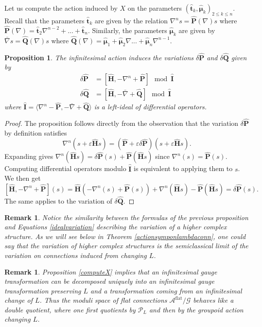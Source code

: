 \documentclass[11pt]{amsart}
\newtheorem{prop}[thm]{Proposition}
\newtheorem{Remark}[thm]{Remark}
\numberwithin{thm}{section} %
\numberwithin{equation}{section} %
\numberwithin{figure}{section} %
\begin{document}
Let us compute the action induced by $X$ on the parameters $(\bm\hat{t}_k, \bm\hat{\mu}_k)_{2\leq k\leq n}$. Recall that the parameters $\bm\hat{t}_k$ are given by the relation $\nabla^n s = \bm\hat{P}(\nabla)s$ where $\bm\hat{P}(\nabla)=\bm\hat{t}_2\nabla^{n-2}+...+\bm\hat{t}_n$. Similarly, the parameters $\bm\hat{\mu}_k$ are given by $\bar{\nabla}s = \bm\hat{Q}(\nabla)s$ where $\bm\hat{Q}(\nabla) = \bm\hat{\mu}_1+\bm\hat{\mu}_2\nabla...+\bm\hat{\mu}_n\nabla^{n-1}$.

\begin{prop}\label{variation-infinit}
The infinitesimal action induces the variations $\delta \bm\hat{P}$ and $\delta \bm\hat{Q}$ given by
\begin{align*}
\delta \bm\hat{P} &= [\bm\hat{H}, -\nabla^n+\bm\hat{P}] \mod \bm\hat{I} \\
\delta \bm\hat{Q} &= [\bm\hat{H}, -\bar{\nabla}+\bm\hat{Q}] \mod \bm\hat{I}
\end{align*}
where $\bm\hat{I} = \langle \nabla^n-\bm\hat{P}, -\bar{\nabla}+\bm\hat{Q} \rangle$ is a left-ideal of differential operators.
\end{prop}

\begin{proof}
The proposition follows directly from the observation that the variation $\delta \bm\hat{P}$ by definition satisfies
$$\nabla^n (s+\varepsilon \bm\hat{H}s) = (\bm\hat{P}+\varepsilon \delta \bm\hat{P})(s+\varepsilon \bm\hat{H}s).$$
Expanding gives $\nabla^n(\bm\hat{H}s) = \delta \bm\hat{P}(s)+\bm\hat{P}(\bm\hat{H}s)$ since $\nabla^n(s) = \bm\hat{P}(s)$. Computing differential operators modulo $\bm\hat{I}$ is equivalent to applying them to $s$. We then get
$$[\bm\hat{H}, -\nabla^n+\bm\hat{P}](s) = \bm\hat{H}(-\nabla^n(s)+\bm\hat{P}(s))+\nabla^n(\bm\hat{H}s)-\bm\hat{P}(\bm\hat{H}s) = \delta \bm\hat{P}(s).$$
The same applies to the variation of $\delta \bm\hat{Q}$.
\end{proof}

\begin{Remark}
Notice the similarity between the formulas of the previous proposition and Equations \eqref{idealvariation} describing the variation of a higher complex structure. As we will see below in Theorem \ref{actionsymponlambdaconn}, one could say that the variation of higher complex structures is the semiclassical limit of the variation on connections induced from changing $L$.
\end{Remark}

\begin{Remark}
Proposition \ref{computeX} implies that an infinitesimal gauge transformation can be decomposed uniquely into an infinitesimal gauge transformation preserving $L$ and a transformation coming from an infinitesimal change of $L$. Thus the moduli space of flat connections $\mathcal{A}^{\text{flat}}/\mathcal{G}$ behaves like a double quotient, where one first quotients by $\mathcal{P}_L$ and then by the groupoid action changing $L$.
\end{Remark}
\end{document}
